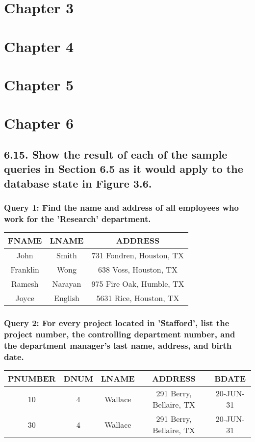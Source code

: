 \documentclass[11pt, oneside]{article}   	%
\begin{document}
\section*{Chapter 3}

\section*{Chapter 4}

\section*{Chapter 5}

\section*{Chapter 6}

\subsection*{6.15. Show the result of each of the sample queries in Section 6.5 as it would apply to the database state in Figure 3.6.} 

\subsubsection*{Query 1: Find the name and address of all employees who work for the 'Research' department.}
\begin{center}
\begin{tabular}{ c | c | c }
  FNAME & LNAME & ADDRESS \\ \hline
  John & Smith & 731 Fondren, Houston, TX \\
  Franklin & Wong & 638 Voss, Houston, TX \\
  Ramesh &  Narayan & 975 Fire Oak, Humble, TX \\
  Joyce & English & 5631 Rice, Houston, TX \\
\end{tabular}
\end{center}

\subsubsection*{Query 2: For every project located in 'Stafford', list the project number, the controlling department number, and the department manager's last name, address, and birth date.}
\begin{center} 
\begin{tabular}{ c | c | c | c | c}
  PNUMBER & DNUM & LNAME & ADDRESS & BDATE \\ \hline
  10 & 4 & Wallace & 291 Berry, Bellaire, TX &20-JUN-31 \\
  30 & 4 & Wallace & 291 Berry, Bellaire, TX & 20-JUN-31 \\ 
\end{tabular}
\end{center}
\end{document}
